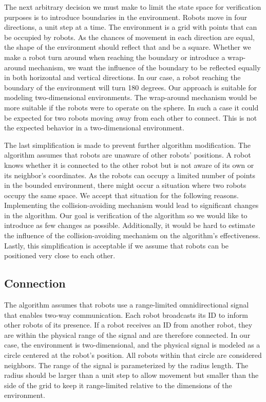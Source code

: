 The next arbitrary decision we must make to limit the state space for verification purposes is to introduce boundaries in the environment. Robots move in four directions, a unit step at a time. The environment is a grid with points that can be occupied by robots. As the chances of movement in each direction are equal, the shape of the environment should reflect that and be a square. Whether we make a robot turn around when reaching the boundary or introduce a wrap-around mechanism, we want the influence of the boundary to be reflected equally in both horizontal and vertical directions. In our case, a robot reaching the boundary of the environment will turn 180 degrees. Our approach is suitable for modeling two-dimensional environments. The wrap-around mechanism would be more suitable if the robots were to operate on the sphere. In such a case it could be expected for two robots moving away from each other to connect. This is not the expected behavior in a two-dimensional environment.

The last simplification is made to prevent further algorithm modification. The algorithm assumes that robots are unaware of other robots' positions. A robot knows whether it is connected to the other robot but is not aware of its own or its neighbor's coordinates. As the robots can occupy a limited number of points in the bounded environment, there might occur a situation where two robots occupy the same space. We accept that situation for the following reasons. Implementing the collision-avoiding mechanism would lead to significant changes in the algorithm. Our goal is verification of the algorithm so we would like to introduce as few changes as possible. Additionally, it would be hard to estimate the influence of the collision-avoiding mechanism on the algorithm's effectiveness. Lastly, this simplification is acceptable if we assume that robots can be positioned very close to each other.



\subsection{Connection}
The algorithm assumes that robots use a range-limited omnidirectional signal that enables two-way communication. Each robot broadcasts its ID to inform other robots of its presence. If a robot receives an ID from another robot, they are within the physical range of the signal and are therefore connected. In our case, the environment is two-dimensional, and the physical signal is modeled as a circle centered at the robot's position. All robots within that circle are considered neighbors. The range of the signal is parameterized by the radius length. The radius should be larger than a unit step to allow movement but smaller than the side of the grid to keep it range-limited relative to the dimensions of the environment.

